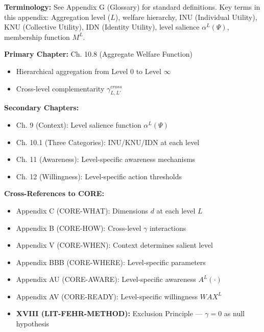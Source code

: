 
\begin{tcolorbox}[colback=gray!5!white, colframe=gray!50!black]
\textbf{Terminology:} See Appendix G (Glossary) for standard definitions.
Key terms in this appendix: Aggregation level ($L$), welfare hierarchy,
INU (Individual Utility), KNU (Collective Utility), IDN (Identity Utility),
level salience $\alpha^L(\Psi)$, membership function $M^L$.
\end{tcolorbox}

\begin{tcolorbox}[colback=green!5!white, colframe=green!75!black,
    title=\textbf{Chapter References}]

\textbf{Primary Chapter:} Ch. 10.8 (Aggregate Welfare Function)
\begin{itemize}[nosep]
    \item Hierarchical aggregation from Level 0 to Level $\infty$
    \item Cross-level complementarity $\gamma^{cross}_{L,L'}$
\end{itemize}

\textbf{Secondary Chapters:}
\begin{itemize}[nosep]
    \item Ch. 9 (Context): Level salience function $\alpha^L(\Psi)$
    \item Ch. 10.1 (Three Categories): INU/KNU/IDN at each level
    \item Ch. 11 (Awareness): Level-specific awareness mechanisms
    \item Ch. 12 (Willingness): Level-specific action thresholds
\end{itemize}

\textbf{Cross-References to CORE:}
\begin{itemize}[nosep]
    \item Appendix C (CORE-WHAT): Dimensions $d$ at each level $L$
    \item Appendix B (CORE-HOW): Cross-level $\gamma$ interactions
    \item Appendix V (CORE-WHEN): Context determines salient level
    \item Appendix BBB (CORE-WHERE): Level-specific parameters
    \item Appendix AU (CORE-AWARE): Level-specific awareness $A^L(\cdot)$
    \item Appendix AV (CORE-READY): Level-specific willingness $WAX^L$
    \item \textbf{XVIII (LIT-FEHR-METHOD):} Exclusion Principle --- $\gamma = 0$ as null hypothesis
\end{itemize}

\end{tcolorbox}

